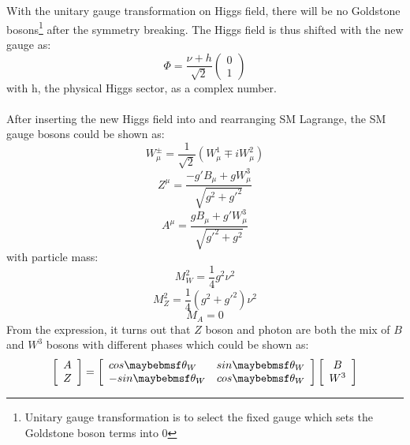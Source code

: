 \\
\\With the unitary gauge transformation on Higgs field, there will be no Goldstone bosons\footnote{Unitary gauge transformation is to select the fixed gauge which sets the Goldstone boson terms into 0} after the symmetry breaking. The Higgs field is thus shifted with the new gauge as:
\begin{equation}
\Phi=\frac{\nu+h}{\sqrt{2}}\left ( \begin{array}{c} 0 \\ 1 \end{array} \right)
\end{equation}
with h, the physical Higgs sector, as a complex number.
\\
\\After inserting the new Higgs field into and rearranging SM Lagrange, the SM gauge bosons could be shown as:  
\begin{equation}
W^{\pm}_\mu=\frac{1}{\sqrt{2}}(W^{1}_\mu\mp iW^{2}_\mu) 
\end{equation}
\begin{equation}
Z^\mu=\frac{-g'B_\mu+gW^3_\mu}{\sqrt{g^2+g'^2}} 
\end{equation}
\begin{equation}
A^\mu=\frac{gB_\mu+g'W^3_\mu}{\sqrt{g'^2+g^2}} 
\end{equation}
with particle mass:
\begin{equation}
M^2_W=\frac{1}{4}g^2\nu^2 
\end{equation}
\begin{equation}
M^2_Z =\frac{1}{4}(g^2+g'^2)\nu^2 
\end{equation}
\begin{equation}
M_A=0 
\end{equation}
From the expression, it turns out that $Z$ boson and photon are both the mix of $B$ and $W^3$ bosons with different phases which could be shown as:
\begin{equation}
 \left[ \begin{array}{c}  A \\ Z \end{array} \right]=\left[ \begin{array}{l r} cos\theta_W &  sin\theta_W \\ -sin\theta_W & cos\theta_W \end{array} \right]\left[ \begin{array}{c}  B\\ W^3 \end{array} \right] 
  \label{Eq:AZ phase}  
\end{equation}
